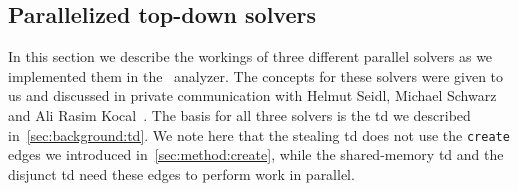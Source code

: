   \subsection{Parallelized top-down solvers}
  \label{sec:method:td_parallel}
  In this section we describe the workings of three different parallel solvers as we implemented them in the \gob\ analyzer. The concepts for these solvers were given to us and discussed in private communication with Helmut Seidl, Michael Schwarz and Ali Rasim Kocal~\cite{privCom}. The basis for all three solvers is the \ac{td} we described in~\autoref{sec:background:td}. We note here that the stealing \ac{td} does not use the \texttt{create} edges we introduced in~\autoref{sec:method:create}, while the shared-memory \ac{td} and the disjunct \ac{td} need these edges to perform work in parallel.

